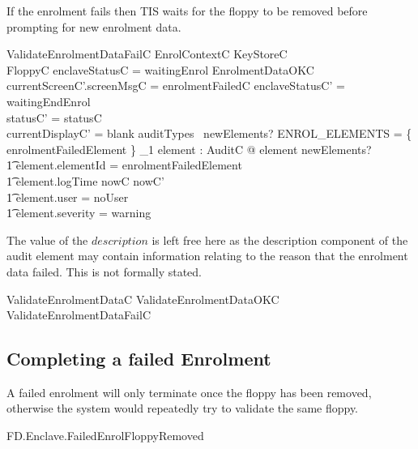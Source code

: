If the enrolment fails then TIS waits for the floppy to be removed
before prompting for new enrolment data. 

\begin{schema}{ValidateEnrolmentDataFailC}
        EnrolContextC
\also
        \Xi KeyStoreC
\\      \Xi FloppyC
\where
        enclaveStatusC = waitingEnrol
\also
        \lnot EnrolmentDataOKC
\also
        currentScreenC'.screenMsgC = enrolmentFailedC
\also
        enclaveStatusC' = waitingEndEnrol
\\      statusC' = statusC
\\      currentDisplayC' = blank
\also
        auditTypes~ newElements? \cap ENROL\_ELEMENTS = 
        \{ enrolmentFailedElement \} 
\also
        \exists_1 element : AuditC @ element \in newElements? 
\\ \t1  \land element.elementId = enrolmentFailedElement
\\ \t1  \land element.logTime \in nowC \upto nowC'
\\ \t1  \land element.user = noUser
\\ \t1  \land element.severity = warning
\end{schema}
\begin{Zcomment}
\item
The value of the $description$ is left free here as the description component of the audit element may contain
information relating to the reason that the enrolment data failed.
This is not formally stated.
\end{Zcomment}

\begin{zed}
        ValidateEnrolmentDataC  ValidateEnrolmentDataOKC \lor
          ValidateEnrolmentDataFailC
\end{zed}

\subsection{Completing a failed Enrolment}

A failed enrolment will only terminate once the floppy has been
removed, otherwise the system would repeatedly try to validate the
same floppy.

\begin{traceunit}{FD.Enclave.FailedEnrolFloppyRemoved}
\end{traceunit}


